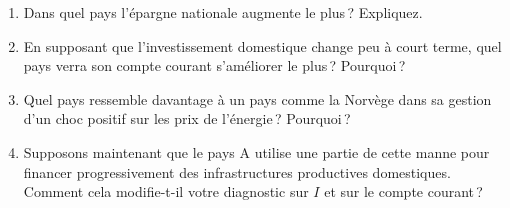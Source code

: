 

\begin{enumerate}[label=(\alph*)]
   \item Dans quel pays l'épargne nationale augmente le plus\,? Expliquez.
   \item En supposant que l'investissement domestique change peu à court terme, quel pays verra son compte courant s'améliorer le plus\,? Pourquoi\,?
   \item Quel pays ressemble davantage à un pays comme la Norvège dans sa gestion d'un choc positif sur les prix de l'énergie\,? Pourquoi\,?
   \item Supposons maintenant que le pays A utilise une partie de cette manne pour financer progressivement des infrastructures productives domestiques. Comment cela modifie-t-il votre diagnostic sur $I$ et sur le compte courant\,?
\end{enumerate}

